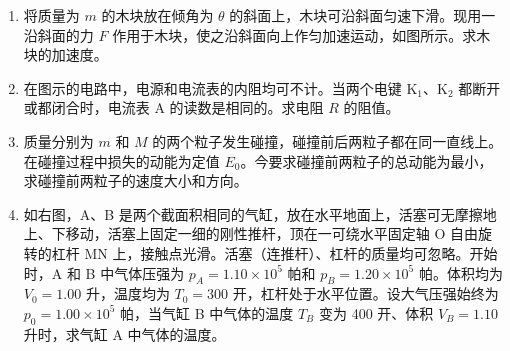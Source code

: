 \documentclass[\gkver]{gaokaozhenti}
\begin{document}
\begin{enumerate}
\item
将质量为 $m$ 的木块放在倾角为 $\theta$ 的斜面上，木块可沿斜面匀速下滑。现用一沿斜面的力 $F$ 作用于木块，使之沿斜面向上作匀加速运动，如图所示。求木块的加速度。

\item
在图示的电路中，电源和电流表的内阻均可不计。当两个电键 K$_{1}$、K$_{2}$ 都断开或都闭合时，电流表 A 的读数是相同的。求电阻 $R$ 的阻值。

\item
质量分别为 $m$ 和 $M$ 的两个粒子发生碰撞，碰撞前后两粒子都在同一直线上。在碰撞过程中损失的动能为定值 $E_{0}$。今要求碰撞前两粒子的总动能为最小，求碰撞前两粒子的速度大小和方向。

\item
如右图，A、B 是两个截面积相同的气缸，放在水平地面上，活塞可无摩擦地上、下移动，活塞上固定一细的刚性推杆，顶在一可绕水平固定轴 O 自由旋转的杠杆 MN 上，接触点光滑。活塞（连推杆）、杠杆的质量均可忽略。开始时，A 和 B 中气体压强为 $p_{A} = 1.10\times10^{5}$ 帕和 $p_{B} = 1.20\times10^{5}$ 帕。体积均为 $V_{0} = 1.00$ 升，温度均为 $T_{0} = 300$ 开，杠杆处于水平位置。设大气压强始终为 $p_{0} = 1.00\times10^{5}$ 帕，当气缸 B 中气体的温度 $T_{B}$ 变为 400 开、体积 $V_{B} = 1.10$ 升时，求气缸 A 中气体的温度。

\end{enumerate}
\end{document}
